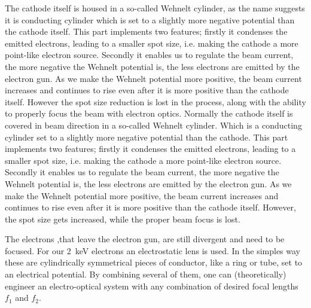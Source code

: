 The cathode itself is housed in a so-called Wehnelt cylinder, as the name suggests it is conducting cylinder which is set to a slightly more negative potential than the cathode itself. This part implements two features; firstly it condenses the emitted electrons, leading to a smaller spot size, i.e. making the cathode a more point-like electron source. Secondly it enables us to regulate the beam current, the more negative the Wehnelt potential is, the less electrons are emitted by the electron gun. As we make the Wehnelt potential more positive, the beam current increases and continues to rise even after it is more positive than the cathode itself. However the spot size reduction is lost in the process, along with the ability to properly focus the beam with electron optics.
Normally the cathode itself is covered in beam direction in a so-called Wehnelt cylinder. Which is a conducting cylinder set to a slightly more negative potential than the cathode. This part implements two features; firstly it condenses the emitted electrons, leading to a smaller spot size, i.e. making the cathode a more point-like electron source. Secondly it enables us to regulate the beam current, the more negative the Wehnelt potential is, the less electrons are emitted by the electron gun. As we make the Wehnelt potential more positive, the beam current increases and continues to rise even after it is more positive than the cathode itself. However, the spot size gets increased, while the proper beam focus is lost.

The electrons ,that leave the electron gun, are still divergent and need to be focused. For our \SI{2}{\kilo\electronvolt} electrons an electrostatic lens is used.  In the simples way these are cylindrically symmetrical pieces of conductor, like a ring or tube, set to an electrical potential. By combining several of them, one can (theoretically) engineer an electro-optical system with any combination of desired focal lengths $f_1$ and $f_2$. 

